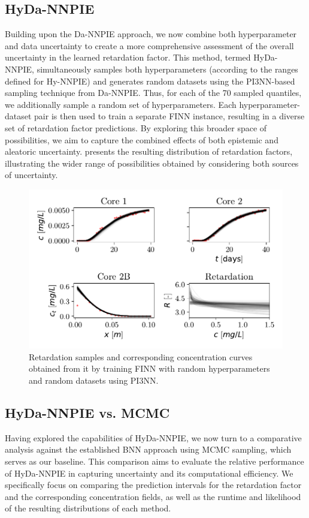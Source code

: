 \subsection{HyDa-NNPIE}
Building upon the Da-NNPIE approach, we now combine both hyperparameter and data uncertainty to create a more comprehensive assessment of the overall uncertainty in the learned retardation factor. This method, termed HyDa-NNPIE, simultaneously samples both hyperparameters (according to the ranges defined for Hy-NNPIE) and generates random datasets using the PI3NN-based sampling technique from Da-NNPIE. Thus, for each of the 70 sampled quantiles, we additionally sample a random set of hyperparameters. Each hyperparameter-dataset pair is then used to train a separate FINN instance, resulting in a diverse set of retardation factor predictions. By exploring this broader space of possibilities, we aim to capture the combined effects of both epistemic and aleatoric uncertainty.  presents the resulting distribution of retardation factors, illustrating the wider range of possibilities obtained by considering both sources of uncertainty.

\begin{figure}[h]
    \centering
    \includegraphics{figs/finn_fullspan_samples.pdf}
    \caption{Retardation samples and corresponding concentration curves obtained from it by training FINN with random hyperparameters and random datasets using PI3NN.}
    \label{fig:fullspan_samples}
\end{figure}



\subsection{HyDa-NNPIE vs. MCMC}
Having explored the capabilities of HyDa-NNPIE, we now turn to a comparative analysis against the established BNN approach using MCMC sampling, which serves as our baseline. This comparison aims to evaluate the relative performance of HyDa-NNPIE in capturing uncertainty and its computational efficiency. We specifically focus on comparing the prediction intervals for the retardation factor and the corresponding concentration fields, as well as the runtime and likelihood of the resulting distributions of each method.

